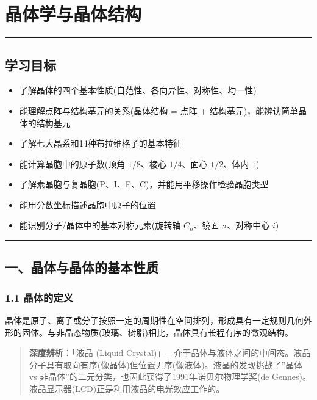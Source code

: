\section{晶体学与晶体结构}\label{ux6676ux4f53ux5b66ux4e0eux6676ux4f53ux7ed3ux6784}

\begin{center}\rule{0.5\linewidth}{0.5pt}\end{center}

\subsection{学习目标}\label{ux5b66ux4e60ux76eeux6807}

\begin{itemize}
\tightlist
\item
  了解晶体的四个基本性质(自范性、各向异性、对称性、均一性)
\item
  能理解点阵与结构基元的关系(晶体结构 = 点阵 + 结构基元)，能辨认简单晶体的结构基元
\item
  了解七大晶系和14种布拉维格子的基本特征
\item
  能计算晶胞中的原子数(顶角 \(1/8\)、棱心 \(1/4\)、面心 \(1/2\)、体内 \(1\))
\item
  了解素晶胞与复晶胞(P、I、F、C)，并能用平移操作检验晶胞类型
\item
  能用分数坐标描述晶胞中原子的位置
\item
  能识别分子/晶体中的基本对称元素(旋转轴 \(C_n\)、镜面 \(\sigma\)、对称中心 \(i\))
\end{itemize}

\begin{center}\rule{0.5\linewidth}{0.5pt}\end{center}

\subsection{一、晶体与晶体的基本性质}\label{ux4e00ux6676ux4f53ux4e0eux6676ux4f53ux7684ux57faux672cux6027ux8d28}

\subsubsection{1.1 晶体的定义}\label{ux6676ux4f53ux7684ux5b9aux4e49}

晶体是原子、离子或分子按照一定的周期性在空间排列，形成具有一定规则几何外形的固体。与非晶态物质(玻璃、树脂)相比，晶体具有长程有序的微观结构。

\begin{quote}
\textbf{深度辨析}：「液晶 (Liquid Crystal)」---介于晶体与液体之间的中间态。液晶分子具有取向有序(像晶体)但位置无序(像液体)。液晶的发现挑战了''晶体 vs 非晶体''的二元分类，也因此获得了1991年诺贝尔物理学奖(de Gennes)。液晶显示器(LCD)正是利用液晶的电光效应工作的。
\end{quote}

